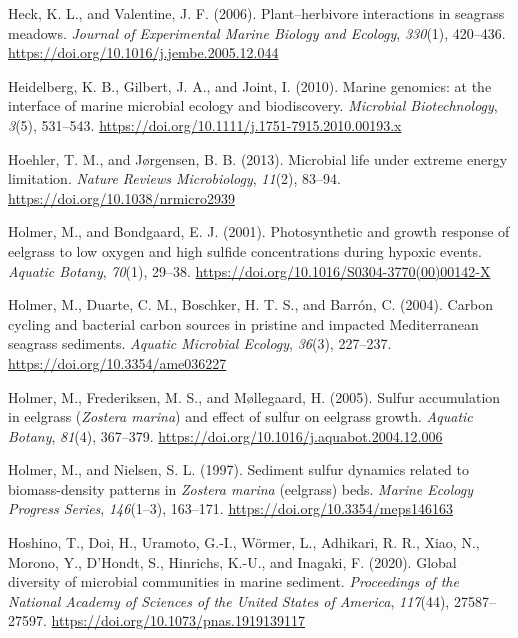 \documentclass[
  12 pt,
]{book}
\newlength{\cslhangindent}
\newlength{\cslentryspacingunit} %
\newenvironment{CSLReferences}[2] %
 {%
  \setlength{\parindent}{0pt}
  \ifodd #1
  \let\oldpar\par
  \def\par{\hangindent=\cslhangindent\oldpar}
  \fi
  \setlength{\parskip}{#2\cslentryspacingunit}
 }%
 {}
\begin{document}
\begin{CSLReferences}{1}{0}
\leavevmode{}%
Heck, K. L., and Valentine, J. F. (2006). Plant--herbivore interactions in seagrass meadows. \emph{Journal of Experimental Marine Biology and Ecology}, \emph{330}(1), 420--436. \url{https://doi.org/10.1016/j.jembe.2005.12.044}

\leavevmode{}%
Heidelberg, K. B., Gilbert, J. A., and Joint, I. (2010). Marine genomics: at the interface of marine microbial ecology and biodiscovery. \emph{Microbial Biotechnology}, \emph{3}(5), 531--543. \url{https://doi.org/10.1111/j.1751-7915.2010.00193.x}

\leavevmode{}%
Hoehler, T. M., and Jørgensen, B. B. (2013). Microbial life under extreme energy limitation. \emph{Nature Reviews Microbiology}, \emph{11}(2), 83--94. \url{https://doi.org/10.1038/nrmicro2939}

\leavevmode{}%
Holmer, M., and Bondgaard, E. J. (2001). Photosynthetic and growth response of eelgrass to low oxygen and high sulfide concentrations during hypoxic events. \emph{Aquatic Botany}, \emph{70}(1), 29--38. \url{https://doi.org/10.1016/S0304-3770(00)00142-X}

\leavevmode{}%
Holmer, M., Duarte, C. M., Boschker, H. T. S., and Barrón, C. (2004). Carbon cycling and bacterial carbon sources in pristine and impacted {Mediterranean} seagrass sediments. \emph{Aquatic Microbial Ecology}, \emph{36}(3), 227--237. \url{https://doi.org/10.3354/ame036227}

\leavevmode{}%
Holmer, M., Frederiksen, M. S., and Møllegaard, H. (2005). Sulfur accumulation in eelgrass ({{{\emph{Zostera marina}}}) and effect of sulfur on eelgrass growth}. \emph{Aquatic Botany}, \emph{81}(4), 367--379. \url{https://doi.org/10.1016/j.aquabot.2004.12.006}

\leavevmode{}%
Holmer, M., and Nielsen, S. L. (1997). Sediment sulfur dynamics related to biomass-density patterns in {{\emph{Zostera marina}}} (eelgrass) beds. \emph{Marine Ecology Progress Series}, \emph{146}(1--3), 163--171. \url{https://doi.org/10.3354/meps146163}

\leavevmode{}%
Hoshino, T., Doi, H., Uramoto, G.-I., Wörmer, L., Adhikari, R. R., Xiao, N., Morono, Y., D'Hondt, S., Hinrichs, K.-U., and Inagaki, F. (2020). Global diversity of microbial communities in marine sediment. \emph{Proceedings of the National Academy of Sciences of the United States of America}, \emph{117}(44), 27587--27597. \url{https://doi.org/10.1073/pnas.1919139117}


\end{CSLReferences}
\end{document}
